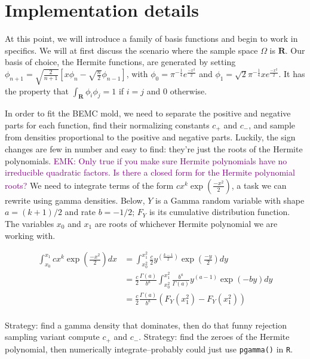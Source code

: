 \documentclass{article}
\newcommand\EMK[1]{\textcolor{purple}{EMK: #1}}
\begin{document}
\section{Implementation details}
At this point, we will introduce a family of basis functions and begin to work in specifics. We will at first discuss the scenario where the sample space $\Omega$ is $\mathbf{R}$. %
Our basis of choice, the Hermite functions, are generated by setting $\phi_{n+1}=\sqrt{\frac{2}{n+1}}\left[x\phi_n-\sqrt{\frac{n}{2}}\phi_{n-1}\right]$, with $\phi_0=\pi^{-\frac{1}{4}}e^{\frac{-x^2}{2}}$ and $\phi_1=\sqrt{2} \pi^{-\frac{1}{4}}xe^{\frac{-x^2}{2}}$. It has the property that $\int_{\mathbf{R}}\phi_i\phi_j=1$ if $i = j$ and $0$ otherwise. 

In order to fit the BEMC mold, we need to separate the positive and negative parts for each function, find their normalizing constants $c_+$ and $c_-$, and sample from densities proportional to the positive and negative parts. Luckily, the sign changes are few in number and easy to find: they're just the roots of the Hermite polynomials. \EMK{Only true if you make sure Hermite polynomials have no irreducible quadratic factors. Is there a closed form for the Hermite polynomial roots?} We need to integrate terms of the form $cx^k\exp(\frac{-x^2}{2})$, a task we can rewrite using gamma densities. Below, $Y$ is a Gamma random variable with shape $a = (k+1)/2$ and rate $b=-1/2$; $F_Y$ is its cumulative distribution function. The variables $x_0$ and $x_1$ are roots of whichever Hermite polynomial we are working with.

\begin{align*}
\int_{x_0}^{x_1} cx^k\exp(\frac{-x^2}{2})dx 
& =  \int_{x_0^2}^{x_1^2} \frac{c}{2}y^{(\frac{k-1}{2})}\exp(\frac{-y}{2})dy \\
& =  \frac{c}{2} \frac{\Gamma(a)}{b^a} \int_{x_0^2}^{x_1^2} \frac{b^a}{\Gamma(a)}y^{(a-1)}\exp(-by)dy \\
& =  \frac{c}{2} \frac{\Gamma(a)}{b^a} (F_Y(x_1^2)-F_Y(x_1^2))\\
\end{align*}

Strategy: find a gamma density that dominates, then do that funny rejection sampling variant  
compute $c_+$ and $c_-$. Strategy: find the zeroes of the Hermite polynomial, then numerically integrate--probably could just use \texttt{pgamma()} in \texttt{R}.
\end{document}
